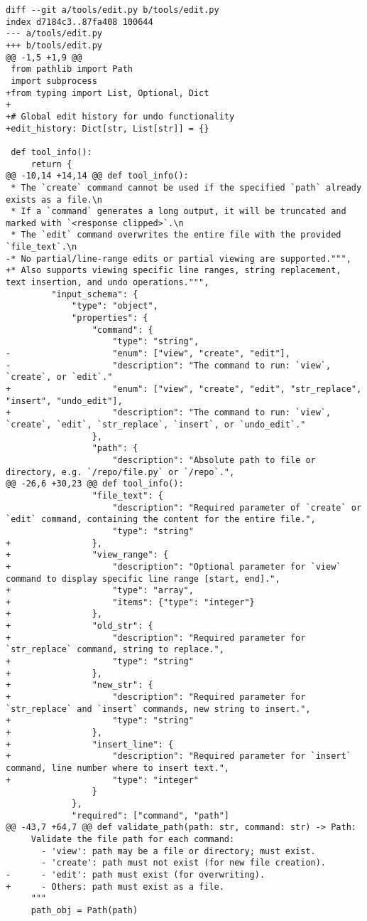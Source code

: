 \begin{lstlisting}[style=diffstyle]
diff --git a/tools/edit.py b/tools/edit.py
index d7184c3..87fa408 100644
--- a/tools/edit.py
+++ b/tools/edit.py
@@ -1,5 +1,9 @@
 from pathlib import Path
 import subprocess
+from typing import List, Optional, Dict
+
+# Global edit history for undo functionality
+edit_history: Dict[str, List[str]] = {}
 
 def tool_info():
     return {
@@ -10,14 +14,14 @@ def tool_info():
 * The `create` command cannot be used if the specified `path` already exists as a file.\n
 * If a `command` generates a long output, it will be truncated and marked with `<response clipped>`.\n
 * The `edit` command overwrites the entire file with the provided `file_text`.\n
-* No partial/line-range edits or partial viewing are supported.""",
+* Also supports viewing specific line ranges, string replacement, text insertion, and undo operations.""",
         "input_schema": {
             "type": "object",
             "properties": {
                 "command": {
                     "type": "string",
-                    "enum": ["view", "create", "edit"],
-                    "description": "The command to run: `view`, `create`, or `edit`."
+                    "enum": ["view", "create", "edit", "str_replace", "insert", "undo_edit"],
+                    "description": "The command to run: `view`, `create`, `edit`, `str_replace`, `insert`, or `undo_edit`."
                 },
                 "path": {
                     "description": "Absolute path to file or directory, e.g. `/repo/file.py` or `/repo`.",
@@ -26,6 +30,23 @@ def tool_info():
                 "file_text": {
                     "description": "Required parameter of `create` or `edit` command, containing the content for the entire file.",
                     "type": "string"
+                },
+                "view_range": {
+                    "description": "Optional parameter for `view` command to display specific line range [start, end].",
+                    "type": "array",
+                    "items": {"type": "integer"}
+                },
+                "old_str": {
+                    "description": "Required parameter for `str_replace` command, string to replace.",
+                    "type": "string"
+                },
+                "new_str": {
+                    "description": "Required parameter for `str_replace` and `insert` commands, new string to insert.",
+                    "type": "string"
+                },
+                "insert_line": {
+                    "description": "Required parameter for `insert` command, line number where to insert text.",
+                    "type": "integer"
                 }
             },
             "required": ["command", "path"]
@@ -43,7 +64,7 @@ def validate_path(path: str, command: str) -> Path:
     Validate the file path for each command:
       - 'view': path may be a file or directory; must exist.
       - 'create': path must not exist (for new file creation).
-      - 'edit': path must exist (for overwriting).
+      - Others: path must exist as a file.
     """
     path_obj = Path(path)
 

\end{lstlisting}
